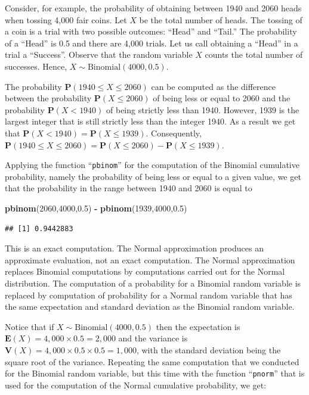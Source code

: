 \documentclass[
]{krantz}
\makeatletter
\newenvironment{Shaded}{\begin{snugshade}}{\end{snugshade}}
\newcommand{\DecValTok}[1]{\textcolor[rgb]{0.00,0.00,0.81}{#1}}
\newcommand{\FloatTok}[1]{\textcolor[rgb]{0.00,0.00,0.81}{#1}}
\newcommand{\KeywordTok}[1]{\textcolor[rgb]{0.13,0.29,0.53}{\textbf{#1}}}
\newcommand{\NormalTok}[1]{#1}
\newcommand{\OperatorTok}[1]{\textcolor[rgb]{0.81,0.36,0.00}{\textbf{#1}}}
\newcommand{\StringTok}[1]{\textcolor[rgb]{0.31,0.60,0.02}{#1}}
\newcommand{\Expec}{\mathbf{E}}
\newcommand{\Prob}{\mathbf{P}}
\newcommand{\Var}{\mathbf{V}}
\newenvironment{kframe}{%
\medskip{}
\setlength{\fboxsep}{.8em}
 \def\at@end@of@kframe{}%
 \ifinner\ifhmode%
  \def\at@end@of@kframe{\end{minipage}}%
  \begin{minipage}{\columnwidth}%
 \fi\fi%
 \def\FrameCommand##1{\hskip\@totalleftmargin \hskip-\fboxsep
 \colorbox{shadecolor}{##1}\hskip-\fboxsep
     \hskip-\linewidth \hskip-\@totalleftmargin \hskip\columnwidth}%
 \MakeFramed {\advance\hsize-\width
   \@totalleftmargin\z@ \linewidth\hsize
   \@setminipage}}%
 {\par\unskip\endMakeFramed%
 \at@end@of@kframe}
\renewenvironment{Shaded}{\begin{kframe}}{\end{kframe}}
\theoremstyle{definition}
\theoremstyle{definition}
\theoremstyle{definition}
\theoremstyle{remark}
\makeatother
\begin{document}
Consider, for example, the probability of obtaining between 1940 and
2060 heads when tossing 4,000 fair coins. Let \(X\) be the total number of
heads. The tossing of a coin is a trial with two possible outcomes:
``Head'' and ``Tail.'' The probability of a ``Head'' is 0.5 and there are
4,000 trials. Let us call obtaining a ``Head'' in a trial a ``Success''.
Observe that the random variable \(X\) counts the total number of
successes. Hence, \(X \sim \mathrm{Binomial}(4000,0.5)\).

The probability \(\Prob(1940 \leq X \leq 2060)\) can be computed as the
difference between the probability \(\Prob(X \leq 2060)\) of being less or
equal to 2060 and the probability \(\Prob(X < 1940)\) of being strictly
less than 1940. However, 1939 is the largest integer that is still
strictly less than the integer 1940. As a result we get that
\(\Prob(X < 1940) = \Prob(X \leq 1939)\). Consequently,
\(\Prob(1940 \leq X \leq 2060) = \Prob(X \leq 2060) - \Prob(X \leq 1939)\).

Applying the function ``\texttt{pbinom}'' for the computation of the Binomial
cumulative probability, namely the probability of being less or equal to
a given value, we get that the probability in the range between 1940 and
2060 is equal to

\begin{Shaded}
\begin{Highlighting}[]
\KeywordTok{pbinom}\NormalTok{(}\DecValTok{2060}\NormalTok{,}\DecValTok{4000}\NormalTok{,}\FloatTok{0.5}\NormalTok{) }\OperatorTok{-}\StringTok{ }\KeywordTok{pbinom}\NormalTok{(}\DecValTok{1939}\NormalTok{,}\DecValTok{4000}\NormalTok{,}\FloatTok{0.5}\NormalTok{)}
\end{Highlighting}
\end{Shaded}

\begin{verbatim}
## [1] 0.9442883
\end{verbatim}

This is an exact computation. The Normal approximation produces an
approximate evaluation, not an exact computation. The Normal
approximation replaces Binomial computations by computations carried out
for the Normal distribution. The computation of a probability for a
Binomial random variable is replaced by computation of probability for a
Normal random variable that has the same expectation and standard
deviation as the Binomial random variable.

Notice that if \(X \sim \mathrm{Binomial}(4000,0.5)\) then the expectation
is \(\Expec(X) = 4,000 \times 0.5 = 2,000\) and the variance is
\(\Var(X) = 4,000 \times 0.5 \times 0.5 = 1,000\), with the standard
deviation being the square root of the variance. Repeating the same
computation that we conducted for the Binomial random variable, but this
time with the function ``\texttt{pnorm}'' that is used for the computation of the
Normal cumulative probability, we get:
\end{document}
